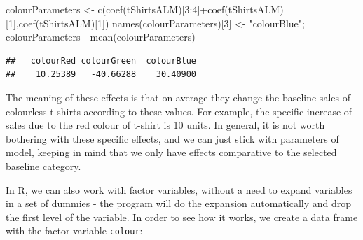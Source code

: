 \documentclass[
]{book}
\newenvironment{Shaded}{\begin{snugshade}}{\end{snugshade}}
\newcommand{\DecValTok}[1]{\textcolor[rgb]{0.00,0.00,0.81}{#1}}
\newcommand{\FunctionTok}[1]{\textcolor[rgb]{0.00,0.00,0.00}{#1}}
\newcommand{\NormalTok}[1]{#1}
\newcommand{\OtherTok}[1]{\textcolor[rgb]{0.56,0.35,0.01}{#1}}
\newcommand{\SpecialCharTok}[1]{\textcolor[rgb]{0.00,0.00,0.00}{#1}}
\newcommand{\StringTok}[1]{\textcolor[rgb]{0.31,0.60,0.02}{#1}}
\theoremstyle{definition}
\theoremstyle{definition}
\theoremstyle{definition}
\theoremstyle{definition}
\theoremstyle{remark}
\begin{document}
\begin{Shaded}
\begin{Highlighting}[]
\NormalTok{colourParameters }\OtherTok{\textless{}{-}} \FunctionTok{c}\NormalTok{(}\FunctionTok{coef}\NormalTok{(tShirtsALM)[}\DecValTok{3}\SpecialCharTok{:}\DecValTok{4}\NormalTok{]}\SpecialCharTok{+}\FunctionTok{coef}\NormalTok{(tShirtsALM)[}\DecValTok{1}\NormalTok{],}\FunctionTok{coef}\NormalTok{(tShirtsALM)[}\DecValTok{1}\NormalTok{])}
\FunctionTok{names}\NormalTok{(colourParameters)[}\DecValTok{3}\NormalTok{] }\OtherTok{\textless{}{-}} \StringTok{"colourBlue"}\NormalTok{;}
\NormalTok{colourParameters }\SpecialCharTok{{-}} \FunctionTok{mean}\NormalTok{(colourParameters)}
\end{Highlighting}
\end{Shaded}

\begin{verbatim}
##   colourRed colourGreen  colourBlue 
##    10.25389   -40.66288    30.40900
\end{verbatim}

The meaning of these effects is that on average they change the baseline sales of colourless t-shirts according to these values. For example, the specific increase of sales due to the red colour of t-shirt is 10 units. In general, it is not worth bothering with these specific effects, and we can just stick with parameters of model, keeping in mind that we only have effects comparative to the selected baseline category.

In R, we can also work with factor variables, without a need to expand variables in a set of dummies - the program will do the expansion automatically and drop the first level of the variable. In order to see how it works, we create a data frame with the factor variable \texttt{colour}:

\begin{Shaded}
\end{Shaded}
\end{document}
